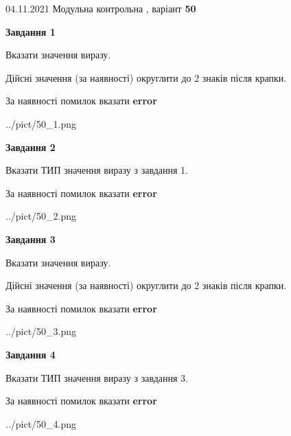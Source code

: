 \documentclass[11pt, ukrainian]{article}
\begin{document}
{04.11.2021 Модульна контрольна , варіант  \No \textbf { 50 }\par}
{
\begin {large}
{\begin {center}\textbf{Завдання 1}\end {center}}\par
Вказати значення виразу. \par
Дійсні значення (за наявності) округлити до 2 знаків після крапки. \par
За наявності помилок вказати \textbf{error}

\begin{center}
	{../pict/50_1.png}
\end{center}
\newpage

{\begin {center}\textbf{Завдання 2}\end {center}}\par
Вказати ТИП значення виразу з завдання 1. \par
За наявності помилок вказати \textbf{error}

\begin{center}
	{../pict/50_2.png}
\end{center}
\newpage

{\begin {center}\textbf{Завдання 3}\end {center}}\par
Вказати значення виразу. \par
Дійсні значення (за наявності) округлити до 2 знаків після крапки. \par
За наявності помилок вказати \textbf{error}

\begin{center}
	{../pict/50_3.png}
\end{center}
\newpage

{\begin {center}\textbf{Завдання 4}\end {center}}\par
Вказати ТИП значення виразу з завдання 3. \par
За наявності помилок вказати \textbf{error}

\begin{center}
	{../pict/50_4.png}
\end{center}
\newpage


\end{large}}
\end{document}
